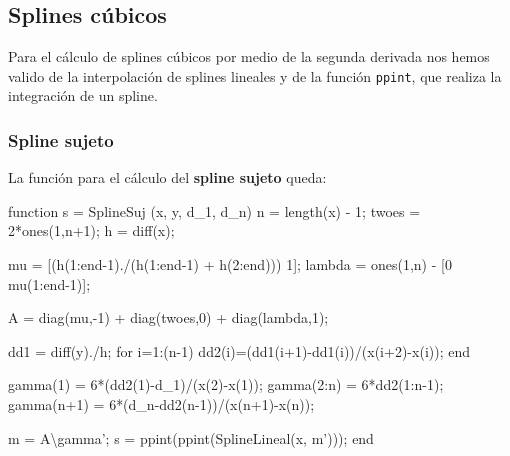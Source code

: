 \documentclass[11pt,spanish,]{article}
\newenvironment{Shaded}{}{}
\newcommand{\BaseNTok}[1]{\textcolor[rgb]{0.25,0.63,0.44}{{#1}}}
\newcommand{\FloatTok}[1]{\textcolor[rgb]{0.25,0.63,0.44}{{#1}}}
\newcommand{\FunctionTok}[1]{\textcolor[rgb]{0.02,0.16,0.49}{{#1}}}
\newcommand{\NormalTok}[1]{{#1}}
\theoremstyle{definition} \newtheorem*{definicion}{Definición}
\begin{document}
\subsection{Splines cúbicos}\label{splines-cuxfabicos-1}

Para el cálculo de splines cúbicos por medio de la segunda derivada nos
hemos valido de la interpolación de splines lineales y de la función
\texttt{ppint}, que realiza la integración de un spline.

\subsubsection{Spline sujeto}\label{spline-sujeto}

La función para el cálculo del \textbf{spline sujeto} queda:

\begin{Shaded}
\begin{Highlighting}[]
\NormalTok{function s = SplineSuj (x, y, d_1, d_n)}
  \NormalTok{n     = }\FunctionTok{length}\NormalTok{(x) - }\FloatTok{1}\NormalTok{;}
  \NormalTok{twoes = }\FloatTok{2}\NormalTok{*}\FunctionTok{ones}\NormalTok{(}\FloatTok{1}\NormalTok{,n+}\FloatTok{1}\NormalTok{);}
  \NormalTok{h     = }\FunctionTok{diff}\NormalTok{(x);}

  \NormalTok{mu     = [(h(}\FloatTok{1}\NormalTok{:end-}\FloatTok{1}\NormalTok{)./(h(}\FloatTok{1}\NormalTok{:end-}\FloatTok{1}\NormalTok{) + h(}\FloatTok{2}\NormalTok{:end))) }\FloatTok{1}\NormalTok{];}
  \NormalTok{lambda = }\FunctionTok{ones}\NormalTok{(}\FloatTok{1}\NormalTok{,n) - [}\FloatTok{0} \NormalTok{mu(}\FloatTok{1}\NormalTok{:end-}\FloatTok{1}\NormalTok{)];}

  \NormalTok{A = }\FunctionTok{diag}\NormalTok{(mu,-}\FloatTok{1}\NormalTok{) + }\FunctionTok{diag}\NormalTok{(twoes,}\FloatTok{0}\NormalTok{) + }\FunctionTok{diag}\NormalTok{(lambda,}\FloatTok{1}\NormalTok{);}

  \NormalTok{dd1 = }\FunctionTok{diff}\NormalTok{(y)./h;}
  \NormalTok{for }\BaseNTok{i}\NormalTok{=}\FloatTok{1}\NormalTok{:(n-}\FloatTok{1}\NormalTok{)}
          \NormalTok{dd2(}\BaseNTok{i}\NormalTok{)=(dd1(}\BaseNTok{i}\NormalTok{+}\FloatTok{1}\NormalTok{)-dd1(}\BaseNTok{i}\NormalTok{))/(x(}\BaseNTok{i}\NormalTok{+}\FloatTok{2}\NormalTok{)-x(}\BaseNTok{i}\NormalTok{));}
  \NormalTok{end}

  \FunctionTok{gamma}\NormalTok{(}\FloatTok{1}\NormalTok{)   = }\FloatTok{6}\NormalTok{*(dd2(}\FloatTok{1}\NormalTok{)-d_1)/(x(}\FloatTok{2}\NormalTok{)-x(}\FloatTok{1}\NormalTok{));}
  \FunctionTok{gamma}\NormalTok{(}\FloatTok{2}\NormalTok{:n) = }\FloatTok{6}\NormalTok{*dd2(}\FloatTok{1}\NormalTok{:n-}\FloatTok{1}\NormalTok{);}
  \FunctionTok{gamma}\NormalTok{(n+}\FloatTok{1}\NormalTok{) = }\FloatTok{6}\NormalTok{*(d_n-dd2(n-}\FloatTok{1}\NormalTok{))/(x(n+}\FloatTok{1}\NormalTok{)-x(n));}

  \NormalTok{m = A\textbackslash{}gamma';}
  \NormalTok{s = ppint(ppint(SplineLineal(x, m')));}
\NormalTok{end}
\end{Highlighting}
\end{Shaded}
\end{document}

